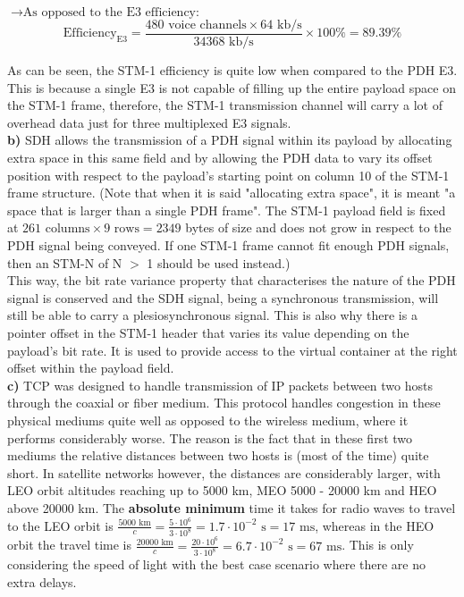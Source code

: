 $\rightarrow\text{As opposed to the E3 efficiency:}$\\
$$\text{Efficiency}_{\text{E3}} = \frac{480 \text{ voice channels}\times 64\text{ kb/s}}{34368\text{ kb/s}}\times 100\% = \mathbf{89.39}\%$$

As can be seen, the STM-1 efficiency is quite low when compared to the PDH E3. This is because a single E3 is not capable of filling up the entire payload space on the STM-1 frame, therefore, the STM-1 transmission channel will carry a lot of overhead data just for three multiplexed E3 signals.\\

\large\textbf{b)} \normalsize
SDH allows the transmission of a PDH signal within its payload by allocating extra space in this same field and by allowing the PDH data to vary its offset position with respect to the payload's starting point on column 10 of the STM-1 frame structure. (Note that when it is said "allocating extra space", it is meant "a space that is larger than a single PDH frame". The STM-1 payload field is fixed at $261 \text{ columns}\times 9 \text{ rows} = 2349$ bytes of size and does not grow in respect to the PDH signal being conveyed. If one STM-1 frame cannot fit enough PDH signals, then an STM-N of N $>$ 1 should be used instead.)\\

This way, the bit rate variance property that characterises the nature of the PDH signal is conserved and the SDH signal, being a synchronous transmission, will still be able to carry a plesiosynchronous signal. This is also why there is a pointer offset in the STM-1 header that varies its value depending on the payload's bit rate. It is used to provide access to the virtual container at the right offset within the payload field.\\

\large\textbf{c)} \normalsize
TCP was designed to handle transmission of IP packets between two hosts through the coaxial or fiber medium. This protocol handles congestion in these physical mediums quite well as opposed to the wireless medium, where it performs considerably worse. The reason is the fact that in these first two mediums the relative distances between two hosts is (most of the time) quite short. In satellite networks however, the distances are considerably larger, with LEO orbit altitudes reaching up to 5000 km, MEO 5000 - 20000 km and HEO above 20000 km.\autocite{book1_pp30} The \textbf{absolute minimum} time it takes for radio waves to travel to the LEO orbit is $\frac{5000 \text{ km}}{c} = \frac{5\cdot 10^6}{3\cdot 10^8} = 1.7\cdot 10^{-2} \text{ s} = 17 \text{ ms}$, whereas in the HEO orbit the travel time is $\frac{20000 \text{ km}}{c} = \frac{20\cdot 10^6}{3\cdot 10^8} = 6.7\cdot 10^{-2} \text{ s} = 67 \text{ ms}$. This is only considering the speed of light with the best case scenario where there are no extra delays.\\

